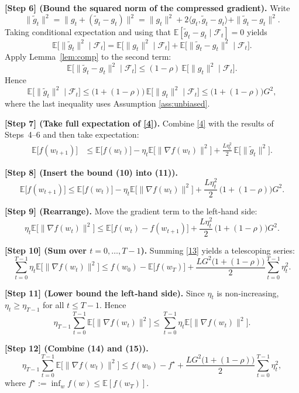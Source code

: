 \documentclass[11pt]{article}
\newcommand{\E}{\mathbb{E}}
\begin{document}
\noindent\textbf{[Step 6] (Bound the squared norm of the compressed gradient).}
Write
\[
\|\tilde g_t\|^{2}
= \|g_t+(\tilde g_t-g_t)\|^{2}
= \|g_t\|^{2}+2\langle g_t,\tilde g_t-g_t\rangle+\|\tilde g_t-g_t\|^{2}.
\]
Taking conditional expectation and using that
\(\E[\tilde g_t-g_t\mid\mathcal{F}_t]=0\) yields
\[
\E\!\big[\|\tilde g_t\|^{2}\mid\mathcal{F}_t\big]
= \E\!\big[\|g_t\|^{2}\mid\mathcal{F}_t\big]
+ \E\!\big[\|\tilde g_t-g_t\|^{2}\mid\mathcal{F}_t\big].
\tag{8}
\]
Apply Lemma~\ref{lem:comp} to the second term:
\[
\E\!\big[\|\tilde g_t-g_t\|^{2}\mid\mathcal{F}_t\big]
\le (1-\rho)\,\E\!\big[\|g_t\|^{2}\mid\mathcal{F}_t\big].
\tag{9}
\]
Hence
\[
\E\!\big[\|\tilde g_t\|^{2}\mid\mathcal{F}_t\big]
\le \big(1+(1-\rho)\big)\,\E\!\big[\|g_t\|^{2}\mid\mathcal{F}_t\big]
\le \big(1+(1-\rho)\big)G^{2},
\tag{10}
\]
where the last inequality uses Assumption \ref{ass:unbiased}.

\noindent\textbf{[Step 7] (Take full expectation of \eqref{4}).}
Combine \eqref{4} with the results of Steps~4–6 and then take expectation:
\[
\begin{aligned}
\E\big[f(w_{t+1})\big]
&\le \E\big[f(w_t)\big]
-\eta_t \E\!\big[\|\nabla f(w_t)\|^{2}\big]
+\frac{L\eta_t^{2}}{2}\,
\E\!\big[\|\tilde g_t\|^{2}\big] .
\end{aligned}
\tag{11}
\]

\noindent\textbf{[Step 8] (Insert the bound (10) into (11)).}
\[
\E\big[f(w_{t+1})\big]
\le \E\big[f(w_t)\big]
-\eta_t \E\!\big[\|\nabla f(w_t)\|^{2}\big]
+\frac{L\eta_t^{2}}{2}\,
\big(1+(1-\rho)\big)G^{2}.
\tag{12}
\]

\noindent\textbf{[Step 9] (Rearrange).}
Move the gradient term to the left‑hand side:
\[
\eta_t \E\!\big[\|\nabla f(w_t)\|^{2}\big]
\le \E\big[f(w_t)-f(w_{t+1})\big]
+\frac{L\eta_t^{2}}{2}\,
\big(1+(1-\rho)\big)G^{2}.
\tag{13}
\]

\noindent\textbf{[Step 10] (Sum over \(t=0,\dots,T-1\)).}
Summing \eqref{13} yields a telescoping series:
\[
\sum_{t=0}^{T-1}\eta_t \E\!\big[\|\nabla f(w_t)\|^{2}\big]
\le f(w_0)-\E\big[f(w_T)\big]
+\frac{L G^{2}\big(1+(1-\rho)\big)}{2}
\sum_{t=0}^{T-1}\eta_t^{2}.
\tag{14}
\]

\noindent\textbf{[Step 11] (Lower bound the left‑hand side).}
Since \(\eta_t\) is non‑increasing, \(\eta_t\ge\eta_{T-1}\) for all
\(t\le T-1\).  Hence
\[
\eta_{T-1}\sum_{t=0}^{T-1}\E\!\big[\|\nabla f(w_t)\|^{2}\big]
\le \sum_{t=0}^{T-1}\eta_t \E\!\big[\|\nabla f(w_t)\|^{2}\big].
\tag{15}
\]

\noindent\textbf{[Step 12] (Combine (14) and (15)).}
\[
\eta_{T-1}\sum_{t=0}^{T-1}\E\!\big[\|\nabla f(w_t)\|^{2}\big]
\le f(w_0)-f^\star
+\frac{L G^{2}\big(1+(1-\rho)\big)}{2}
\sum_{t=0}^{T-1}\eta_t^{2},
\tag{16}
\]
where \(f^\star:=\inf_w f(w)\le \E[f(w_T)]\).
\end{document}
